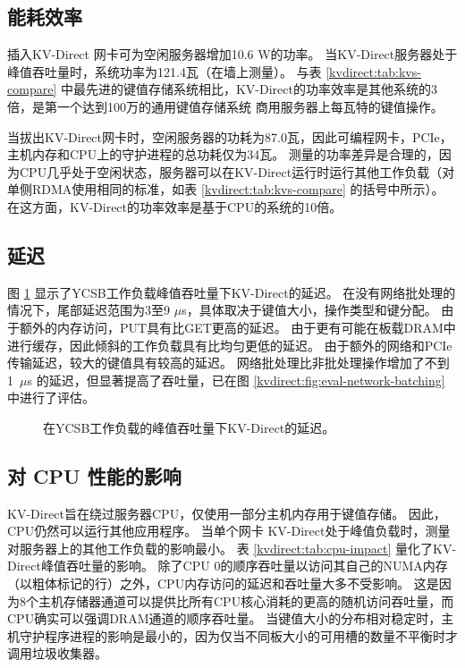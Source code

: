 \subsection{能耗效率}

插入KV-Direct 网卡可为空闲服务器增加10.6 W的功率。
当KV-Direct服务器处于峰值吞吐量时，系统功率为121.4瓦（在墙上测量）。
与表 \ref {kvdirect:tab:kvs-compare} 中最先进的键值存储系统相比，KV-Direct的功率效率是其他系统的3倍，是第一个达到100万的通用键值存储系统 商用服务器上每瓦特的键值操作。

当拔出KV-Direct网卡时，空闲服务器的功耗为87.0瓦，因此可编程网卡，PCIe，主机内存和CPU上的守护进程的总功耗仅为34瓦。
测量的功率差异是合理的，因为CPU几乎处于空闲状态，服务器可以在KV-Direct运行时运行其他工作负载（对单侧RDMA使用相同的标准，如表 \ref{kvdirect:tab:kvs-compare} 的括号中所示）。
在这方面，KV-Direct的功率效率是基于CPU的系统的10倍。

\subsection{延迟}

图 \ref {kvdirect:fig:ycsb-lat} 显示了YCSB工作负载峰值吞吐量下KV-Direct的延迟。
在没有网络批处理的情况下，尾部延迟范围为3至9 $\mu$s，具体取决于键值大小，操作类型和键分配。
由于额外的内存访问，PUT具有比GET更高的延迟。
由于更有可能在板载DRAM中进行缓存，因此倾斜的工作负载具有比均匀更低的延迟。
由于额外的网络和PCIe传输延迟，较大的键值具有较高的延迟。
网络批处理比非批处理操作增加了不到1~$\mu$s 的延迟，但显著提高了吞吐量，已在图 \ref {kvdirect:fig:eval-network-batching} 中进行了评估。

\begin{figure}[htbp]
	\centering
	\caption{在YCSB工作负载的峰值吞吐量下KV-Direct的延迟。}
	\label{kvdirect:fig:ycsb-lat}
\end{figure}

\subsection{对 CPU 性能的影响}


KV-Direct旨在绕过服务器CPU，仅使用一部分主机内存用于键值存储。 因此，CPU仍然可以运行其他应用程序。
当单个网卡 KV-Direct处于峰值负载时，测量对服务器上的其他工作负载的影响最小。
表 \ref {kvdirect:tab:cpu-impact} 量化了KV-Direct峰值吞吐量的影响。
除了CPU 0的顺序吞吐量以访问其自己的NUMA内存（以粗体标记的行）之外，CPU内存访问的延迟和吞吐量大多不受影响。
这是因为8个主机存储器通道可以提供比所有CPU核心消耗的更高的随机访问吞吐量，而CPU确实可以强调DRAM通道的顺序吞吐量。
当键值大小的分布相对稳定时，主机守护程序进程的影响是最小的，因为仅当不同板大小的可用槽的数量不平衡时才调用垃圾收集器。

